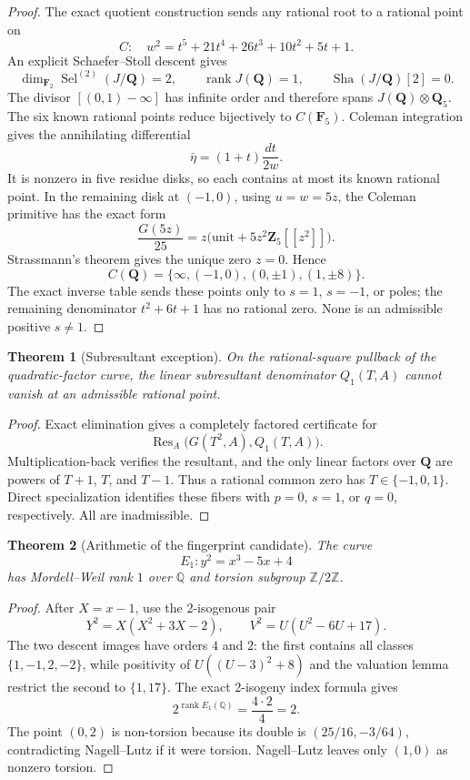 \documentclass[11pt]{article}
\newtheorem{theorem}{Theorem}
\begin{document}
\begin{proof}
The exact quotient construction sends any rational root to a rational point
on
\[
 C:\quad w^2=t^5+21t^4+26t^3+10t^2+5t+1.
\]
An explicit Schaefer--Stoll descent gives
\[
 \dim_{\mathbf F_2}\operatorname{Sel}^{(2)}(J/\mathbf Q)=2,
 \qquad \operatorname{rank}J(\mathbf Q)=1,
 \qquad \operatorname{Sha}(J/\mathbf Q)[2]=0.
\]
The divisor $[(0,1)-\infty]$ has infinite order and therefore spans
$J(\mathbf Q)\otimes\mathbf Q_5$.  The six known rational points reduce
bijectively to $C(\mathbf F_5)$.  Coleman integration gives the annihilating
differential
\[
 \bar\eta=(1+t)\frac{dt}{2w}.
\]
It is nonzero in five residue disks, so each contains at most its known
rational point.  In the remaining disk at $(-1,0)$, using $u=w=5z$, the
Coleman primitive has the exact form
\[
 \frac{G(5z)}{25}=z\bigl(\text{unit}+5z^2\mathbf Z_5[[z^2]]\bigr).
\]
Strassmann's theorem gives the unique zero $z=0$.  Hence
\[
 C(\mathbf Q)=\{\infty,(-1,0),(0,\pm1),(1,\pm8)\}.
\]
The exact inverse table sends these points only to $s=1$, $s=-1$, or poles;
the remaining denominator $t^2+6t+1$ has no rational zero.  None is an
admissible positive $s\ne1$.
\end{proof}

\begin{theorem}[Subresultant exception]
On the rational-square pullback of the quadratic-factor curve, the linear
subresultant denominator $Q_1(T,A)$ cannot vanish at an admissible rational
point.
\end{theorem}

\begin{proof}
Exact elimination gives a completely factored certificate for
\[
 \operatorname{Res}_A\bigl(G(T^2,A),Q_1(T,A)\bigr).
\]
Multiplication-back verifies the resultant, and the only linear factors over
$\mathbf Q$ are powers of $T+1$, $T$, and $T-1$.  Thus a rational common zero
has $T\in\{-1,0,1\}$.  Direct specialization identifies these fibers with
$p=0$, $s=1$, or $q=0$, respectively.  All are inadmissible.
\end{proof}

\begin{theorem}[Arithmetic of the fingerprint candidate]
The curve
\[
 E_1:y^2=x^3-5x+4
\]
has Mordell--Weil rank $1$ over $\mathbb Q$ and torsion subgroup
$\mathbb Z/2\mathbb Z$.
\end{theorem}

\begin{proof}
After $X=x-1$, use the 2-isogenous pair
\[
 Y^2=X(X^2+3X-2),\qquad
 V^2=U(U^2-6U+17).
\]
The two descent images have orders $4$ and $2$: the first contains all
classes $\{1,-1,2,-2\}$, while positivity of
$U((U-3)^2+8)$ and the valuation lemma restrict the second to
$\{1,17\}$.  The exact 2-isogeny index formula gives
\[
 2^{\operatorname{rank}E_1(\mathbb Q)}=\frac{4\cdot2}{4}=2.
\]
The point $(0,2)$ is non-torsion because its double is
$(25/16,-3/64)$, contradicting Nagell--Lutz if it were torsion.
Nagell--Lutz leaves only $(1,0)$ as nonzero torsion.
\end{proof}
\end{document}
